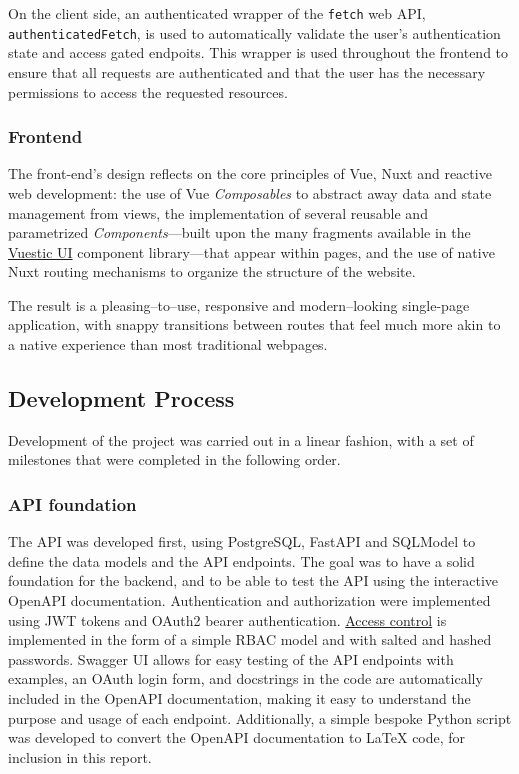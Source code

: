 \documentclass[11pt,italian,a4paper]{article}
\newcommand{\todo}[1]{\noindent {\Huge \color{orange} TODO -- #1}}
\begin{document}
On the client side, an authenticated wrapper of the \texttt{fetch} web API, \texttt{authenticatedFetch}, is used to automatically validate the user's authentication state and access gated endpoits. This wrapper is used throughout the frontend to ensure that all requests are authenticated and that the user has the necessary permissions to access the requested resources.

\subsubsection{Frontend}

The front-end's design reflects on the core principles of Vue, Nuxt and reactive web development: the use of Vue \textit{Composables} to abstract away data and state management from views, the implementation of several reusable and parametrized \textit{Components}---built upon the many fragments available in the \href{https://ui.vuestic.dev/}{Vuestic UI} component library---that appear within pages, and the use of native Nuxt routing mechanisms to organize the structure of the website.

The result is a pleasing--to--use, responsive and modern--looking single-page application, with snappy transitions between routes that feel much more akin to a native experience than most traditional webpages.



\subsection{Development Process}


Development of the project was carried out in a linear fashion, with a set of milestones that were completed in the following order.

\subsubsection{API foundation}
The API was developed first, using PostgreSQL, FastAPI and SQLModel to define the data models and the API endpoints. The goal was to have a solid foundation for the backend, and to be able to test the API using the interactive OpenAPI documentation. Authentication and authorization were implemented using JWT tokens and OAuth2 bearer authentication. \hyperref[sec:auth]{Access control} is implemented in the form of a simple RBAC model and with salted and hashed passwords. Swagger UI allows for easy testing of the API endpoints with examples, an OAuth login form, and docstrings in the code are automatically included in the OpenAPI documentation, making it easy to understand the purpose and usage of each endpoint. Additionally, a simple bespoke Python script was developed to convert the OpenAPI documentation to \LaTeX{} code, for inclusion in this report.
\end{document}
